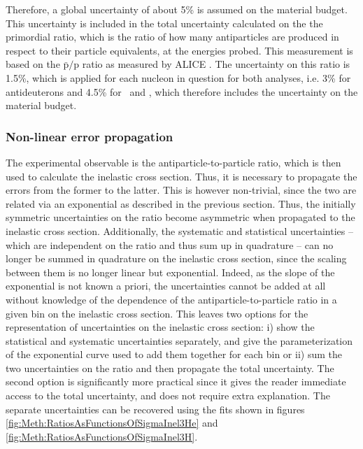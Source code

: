 Therefore, a global uncertainty of about 5\% is assumed on the material budget. This uncertainty is included in the total uncertainty calculated on the the primordial ratio, which is the ratio of how many antiparticles are produced in respect to their particle equivalents, at the energies probed. This measurement is based on the $\bar{\mathrm{p}}/\mathrm{p}$ ratio as measured by ALICE \cite{primordial_ratio1, primordial_ratio2, Abbas_2013_primordial_ratio}. The uncertainty on this ratio is 1.5\%, which is applied for each nucleon in question for both analyses, i.e. 3\% for antideuterons and 4.5\% for \ahe\ and \atrit , which therefore includes the uncertainty on the material budget.

\subsubsection{Non-linear error propagation}
The experimental observable is the antiparticle-to-particle ratio, which is then used to calculate the inelastic cross section. Thus, it is necessary to propagate the errors from the former to the latter. This is however non-trivial, since the two are related via an exponential as described in the previous section. Thus, the initially symmetric uncertainties on the ratio become asymmetric when propagated to the inelastic cross section. Additionally, the systematic and statistical uncertainties -- which are independent on the ratio and thus sum up in quadrature -- can no longer be summed in quadrature on the inelastic cross section, since the scaling between them is no longer linear but exponential. Indeed, as the slope of the exponential is not known a priori, the uncertainties cannot be added at all without knowledge of the dependence of the antiparticle-to-particle ratio in a given bin on the inelastic cross section. This leaves two options for the representation of uncertainties on the inelastic cross section: i) show the statistical and systematic uncertainties separately, and give the parameterization of the exponential curve used to add them together for each bin or ii) sum the two uncertainties on the ratio and then propagate the total uncertainty. The second option is significantly more practical since it gives the reader immediate access to the total uncertainty, and does not require extra explanation. The separate uncertainties can be recovered using the fits shown in figures \ref{fig:Meth:RatiosAsFunctionsOfSigmaInel3He} and \ref{fig:Meth:RatiosAsFunctionsOfSigmaInel3H}. \\

